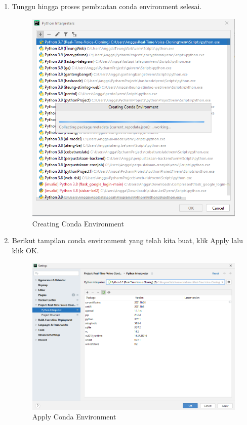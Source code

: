 \begin{enumerate}
\item Tunggu hingga proses pembuatan conda environment selesai. 
\begin{figure}[H]
\centering
\includegraphics[scale=.4]{figures/cenv5}
\caption{Creating Conda Environment}
\label{cenv5}
\end{figure}

\item Berikut tampilan conda environment yang telah kita buat, klik Apply lalu klik OK.
\begin{figure}[H]
\centering
\includegraphics[scale=.4]{figures/cenv6}
\caption{Apply Conda Environment}
\label{cenv6}
\end{figure}


\end{enumerate}
